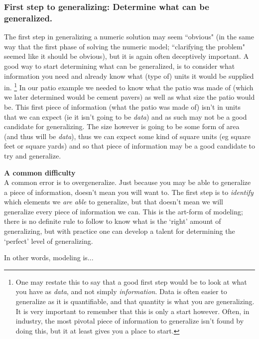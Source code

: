 \documentclass{ximeraXloud}
\begin{document}
\subsubsection*{First step to generalizing: Determine what can be generalized.}
    The first step in generalizing a numeric solution may seem ``obvious" (in the same way that the first phase of solving the numeric model; ``clarifying the problem" seemed like it should be obvious), but it is again often deceptively important. A good way to start determining what can be generalized, is to consider what information you need and already know what (type of) units it would be supplied in.
    \footnote{One may restate this to say that a good first step would be to look at what you have as \textit{data}, and not simply \textit{information}. Data is often easier to generalize as it is quantifiable, and that quantity is what you are generalizing. It is very important to remember that this is only a start however. Often, in industry, the most pivotal piece of information to generalize isn't found by doing this, but it at least gives you a place to start.}
    In our patio example we needed to know what the patio was made of (which we later determined would be cement pavers) as well as what size the patio would be. This first piece of information (what the patio was made of) isn't in units that we can expect (ie it isn't going to be \textit{data}) and as such may not be a good candidate for generalizing. The size however is going to be some form of area (and thus will be \textit{data}), thus we can expect some kind of square units (eg square feet or square yards) and so that piece of information may be a good candidate to try and generalize.
    
    \begin{exploration}
        {\large\bfseries A common difficulty}\\
        
        A common error is to overgeneralize. Just because you may be able to generalize a piece of information, doesn't mean you will want to. The first step is to \emph{identify} which elements we \emph{are able} to generalize, but that doesn't mean we will generalize every piece of information we can. This is the art-form of modeling; there is no definite rule to follow to know what is the `right' amount of generalizing, but with practice one can develop a talent for determining the `perfect' level of generalizing.
        
        In other words, modeling is...
        
        \begin{multipleChoice}
        \end{multipleChoice}
    \end{exploration}
\end{document}
